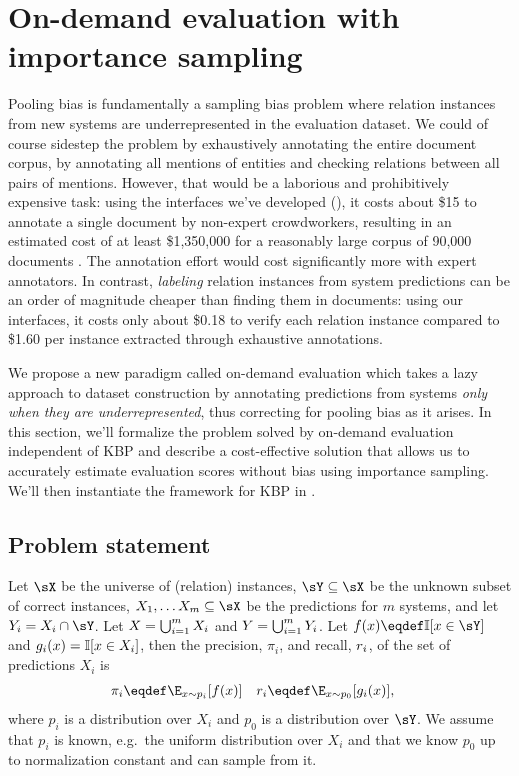 \section{On-demand evaluation with importance sampling}
\label{sec:kbpo:method}

Pooling bias is fundamentally a sampling bias problem where relation instances from new systems are underrepresented in the evaluation dataset.
We could of course sidestep the problem by exhaustively annotating the entire document corpus, by annotating all mentions of entities and checking relations between all pairs of mentions. However, that would be a laborious and prohibitively expensive task:
using the interfaces we've developed (), it costs about \$15 to annotate a single document by non-expert crowdworkers, resulting in an estimated cost of at least \$1,350,000 for a reasonably large corpus of 90,000 documents \citep{dang2016kbp}.
The annotation effort would cost significantly more with expert annotators.
In contrast, \textit{labeling} 
relation instances from system predictions
can be an order of magnitude cheaper than finding them in documents: using our interfaces, it costs only about \$0.18 to verify each relation instance compared to \$1.60 per instance extracted through exhaustive annotations.

We propose a new paradigm called on-demand evaluation which takes a lazy approach to dataset construction by annotating predictions from systems \textit{only when they are underrepresented}, thus correcting for pooling bias as it arises.
In this section, we'll formalize the problem solved by on-demand evaluation independent of KBP and describe a cost-effective solution that allows us to accurately estimate evaluation scores
without bias using importance sampling.
We'll then instantiate the framework for KBP in .

\subsection{Problem statement}
Let $\sX$ be the universe of %
(relation) instances,
  $\sY \subseteq \sX$ be the unknown subset of correct instances,
  $X_1, \ldots X_m \subseteq \sX$ be the predictions for $m$ systems,
  and let $Y_i = X_i \cap \sY$.
Let $X = \bigcup_{i=1}^m X_i$ and $Y = \bigcup_{i=1}^m Y_i$.
Let $f(x) \eqdef \I[x \in \sY]$ and $g_i(x) = \mathbb{I}[x \in X_i]$, then the precision, $\pi_i$, and recall, $r_i$, of the set of predictions $X_i$ is
\begin{align*}
  \pi_i  &\eqdef \E_{x \sim p_i}[f(x)] &
  \recall_i &\eqdef \E_{x \sim p_0}[g_i(x)],
\end{align*}
where $p_i$ is a distribution over $X_i$ and $p_0$ is a distribution over $\sY$.
We assume that $p_i$ is known, e.g.\, the uniform distribution over $X_i$
and that we know $p_0$ up to normalization constant and can sample from it.

